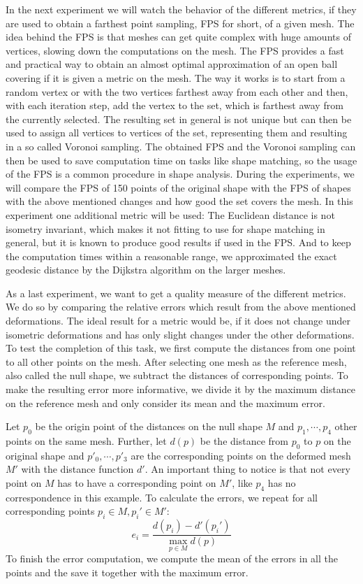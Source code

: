 In the next experiment we will watch the behavior of the different metrics, if they are used to obtain a farthest point sampling, FPS for short, of a given mesh.
The idea behind the FPS is that meshes can get quite complex with huge amounts of vertices, slowing down the computations on the mesh.
The FPS provides a fast and practical way to obtain an almost optimal approximation of an open ball covering if it is given a metric on the mesh.
The way it works is to start from a random vertex or with the two vertices farthest away from each other and then, with each iteration step, add the vertex to the set, which is farthest away from the currently selected.
The resulting set in general is not unique but can then be used to assign all vertices to vertices of the set, representing them and resulting in a so called Voronoi sampling.
The obtained FPS and the Voronoi sampling can then be used to save computation time on tasks like shape matching, so the usage of the FPS is a common procedure in shape analysis.
During the experiments, we will compare the FPS of 150 points  of the original shape with the FPS of shapes with the above mentioned changes and how good the set covers the mesh.
In this experiment one additional metric will be used:
The Euclidean distance is not isometry invariant, which makes it not fitting to use for shape matching in general, but it is known to produce good results if used in the FPS.
And to keep the computation times within a reasonable range, we approximated the exact geodesic distance by the Dijkstra algorithm on the larger meshes.

As a last experiment, we want to get a quality measure of the different metrics.
We do so by comparing the relative errors which result from the above mentioned deformations.
The ideal result for a metric would be, if it does not change under isometric deformations and has only slight changes under the other deformations.
To test the completion of this task, we first compute the distances from one point to all other points on the mesh.
After selecting one mesh as the reference mesh, also called the null shape, we subtract the distances of corresponding points.
To make the resulting error more informative, we divide it by the maximum distance on the reference mesh and only consider its mean and the maximum error.
\begin{example}
	Let $p_0$ be the origin point of the distances on the null shape $M$ and $p_1,\cdots,p_4$ other points on the same mesh.
	Further, let $d(p)$ be the distance from $p_0$ to $p$ on the original shape and $p'_0, \cdots, p'_3$ are the corresponding points on the deformed mesh $M'$ with the distance function $d'$.
	An important thing to notice is that not every point on $M$ has to have a corresponding point on $M'$, like $p_4$ has no correspondence in this example.
	To calculate the errors, we repeat for all corresponding points $p_i\in M, p_i' \in M'$:
	$$e_i = \frac{d(p_i) - d'(p_i')}{\max_{p\in M} d(p)}$$
	\noindent To finish the error computation, we compute the mean of the errors in all the points and the save it together with the maximum error.
\end{example}

